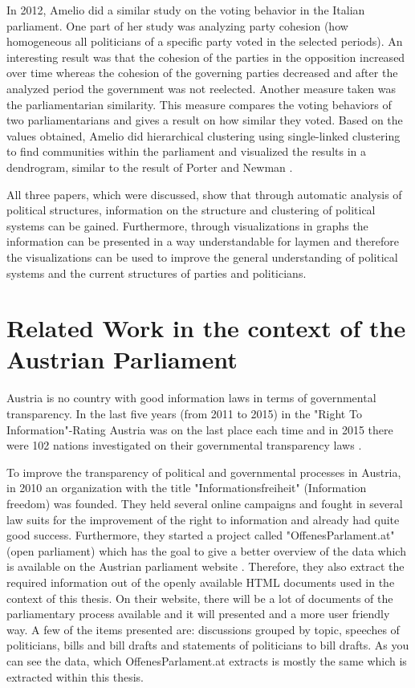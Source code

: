 In 2012, Amelio \cite{Amelio_2012} did a similar study on the voting behavior in the Italian parliament. One part of her study was analyzing party cohesion (how homogeneous all politicians of a specific party voted in the selected periods). An interesting result was that the cohesion of the parties in the opposition increased over time whereas the cohesion of the governing parties decreased and after the analyzed period the government was not reelected. Another measure taken was the parliamentarian similarity. This measure compares the voting behaviors of two parliamentarians and gives a result on how similar they voted. Based on the values obtained, Amelio did hierarchical clustering using single-linked clustering to find communities within the parliament and visualized the results in a dendrogram, similar to the result of Porter and Newman \cite{Porter_2005}. 

All three papers, which were discussed, show that through automatic analysis of political structures, information on the structure and clustering of political systems can be gained. Furthermore, through visualizations in graphs the information can be presented in a way understandable for laymen and therefore the visualizations can be used to improve the general understanding of political systems and the current structures of parties and politicians.

\section{Related Work in the context of the Austrian Parliament}
Austria is no country with good information laws in terms of governmental transparency. In the last five years (from 2011 to 2015) in the "Right To Information"-Rating Austria was on the last place each time and in 2015 there were 102 nations investigated on their governmental transparency laws \cite{Informationsfreiheit_2015}.

To improve the transparency of political and governmental processes in Austria, in 2010 an organization with the title "Informationsfreiheit" (Information freedom) \cite{Informationsfreiheit_2015} was founded. They held several online campaigns and fought in several law suits for the improvement of the right to information and already had quite good success. Furthermore, they started a project called "OffenesParlament.at" (open parliament) \cite{OffenesParlament_2015} which has the goal to give a better overview of the data which is available on the Austrian parliament website \cite{AustrianParliament_2015}. Therefore, they also extract the required information out of the openly available HTML documents used in the context of this thesis. On their website, there will be a lot of documents of the parliamentary process available and it will presented and a more user friendly way. A few of the items presented are: discussions grouped by topic, speeches of politicians, bills and bill drafts and statements of politicians to bill drafts. As you can see the data, which OffenesParlament.at extracts is mostly the same which is extracted within this thesis.

